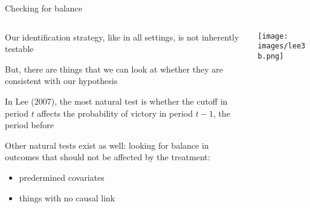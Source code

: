 \documentclass[notes,11pt, aspectratio=169]{beamer}
\newenvironment{wideitemize}{\itemize\addtolength{\itemsep}{10pt}}{\enditemize}
\begin{document}
\begin{frame}{Checking for balance}
  \begin{columns}[onlytextwidth, T] %
    \begin{column}{.5\textwidth}
      \begin{wideitemize}
      \item Our identification strategy, like in all settings, is
        not inherently testable
      \item But, there are things that we can look at whether they
        are consistent with our hypothesis
      \item In Lee (2007), the most natural test is whether the
        cutoff in period $t$ affects the probability of victory in
        period $t-1$, the period before
      \item Other natural tests exist as well: looking for balance
        in outcomes that should not be affected by the treatment:
        \begin{itemize}
        \item predermined covariates
        \item things with no causal link 
        \end{itemize}
      \end{wideitemize}
    \end{column}%
    \hfill%
    \begin{column}{.5\textwidth}
      \texttt{[image: images/lee3b.png]}
    \end{column}%
  \end{columns}
\end{frame}
\end{document}
